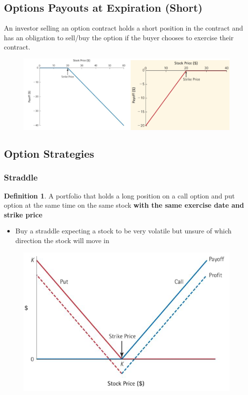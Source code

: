 \documentclass[11pt]{article}
\theoremstyle{definition}
\newtheorem*{definition}{Definition}
\begin{document}
\subsection{Options Payouts at Expiration (Short)}
An investor selling an option contract holds a short position in the contract and has an obligation to sell/buy the option if the buyer chooses to exercise their contract.
\begin{figure}[h]
    \centering
    \includegraphics[scale=0.35]{Screenshot 2023-12-12 at 01.21.35.png}
\end{figure}

\subsection{Option Strategies}
\subsubsection{Straddle}
\begin{definition}
    A portfolio that holds a long position on a call option and put option at the same time on the same stock \textbf{with the same exercise date and strike price}
\end{definition}
\begin{itemize}
    \item Buy a straddle expecting a stock to be very volatile but unsure of which direction the stock will move in
\end{itemize}
\begin{figure}[h]
    \centering
    \includegraphics[scale=.25]{Screenshot 2023-12-12 at 01.35.22.png}
\end{figure}
\end{document}
